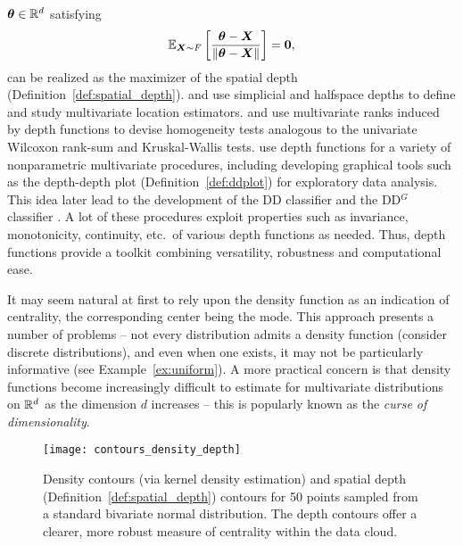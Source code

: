 $\bm{\theta} \in \mathbb{R}^d$ satisfying
\begin{equation}
    \operatorname{\mathbb{E}}_{\bm{X} \sim F}\left[\frac{\bm{\theta} - \bm{X}}{\Vert \bm{\theta} - \bm{X} \Vert}\right] = \bm{0},
\end{equation}
can be realized as the maximizer of the spatial depth
(Definition~\ref{def:spatial_depth}).
\textcite{liu-1990} and \textcite{donoho-gasko-1992} use simplicial and
halfspace depths to define and study multivariate location estimators.
\textcite{liu-singh-1993} and \textcite{chenouri-small-2012} use multivariate
ranks induced by depth functions to devise homogeneity tests analogous to the
univariate Wilcoxon rank-sum and Kruskal-Wallis tests.
\textcite{liu-parelius-singh-1999} use depth functions for a variety of
nonparametric multivariate procedures, including developing graphical tools
such as the depth-depth plot (Definition~\ref{def:ddplot}) for exploratory
data analysis.
This idea later lead to the development of the DD classifier
\parencite{li-albertos-liu-2012} and the DD$^G$
classifier \parencite{albertos-bande-fuente-2017}.
A lot of these procedures exploit properties such as invariance, monotonicity,
continuity, etc.\ of various depth functions as needed.
Thus, depth functions provide a toolkit combining versatility, robustness and
computational ease.


It may seem natural at first to rely upon the density function as an
indication of centrality, the corresponding center being the mode.
This approach presents a number of problems -- not every distribution admits a
density function (consider discrete distributions), and even when one exists,
it may not be particularly informative (see Example~\ref{ex:uniform}).
A more practical concern is that density functions become increasingly
difficult to estimate for multivariate distributions on $\mathbb{R}^d$ as the
dimension $d$ increases -- this is popularly known as the \emph{curse of
dimensionality}.

\begin{figure}
    \centering
    \texttt{[image: contours\_density\_depth]}
    \caption{
        Density contours (via kernel density estimation) and spatial depth
        (Definition~\ref{def:spatial_depth}) contours for 50 points sampled
        from a standard bivariate normal distribution.
        The depth contours offer a clearer, more robust measure of centrality
        within the data cloud.
    }
    \label{fig:contours_density_depth}
\end{figure}


